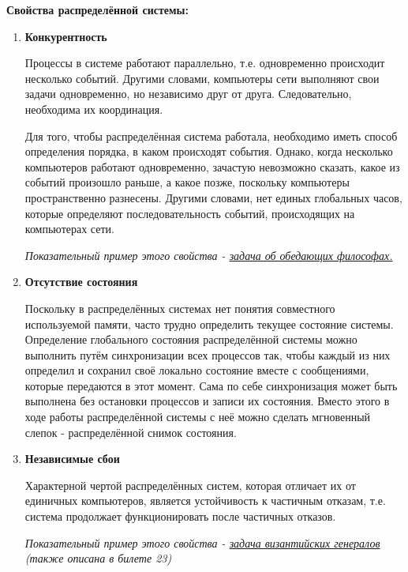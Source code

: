 \textbf{ Свойства распределённой системы:}
\begin{enumerate}
\item \textbf{Конкурентность}

Процессы в системе работают параллельно, т.е. одновременно происходит несколько событий. Другими словами, компьютеры сети выполняют свои задачи одновременно, но независимо друг от друга. Следовательно, необходима их координация.

Для того, чтобы распределённая система работала, необходимо иметь способ определения порядка, в каком происходят события. Однако, когда несколько компьютеров работают одновременно, зачастую невозможно сказать, какое из событий произошло раньше, а какое позже, поскольку компьютеры пространственно разнесены. Другими словами, нет единых глобальных часов, которые определяют последовательность событий, происходящих на компьютерах сети.

\textit{Показательный пример этого свойства - \textcolor{blue}{\href{https://clck.ru/puqyK}{задача об обедающих философах.}}}

\item \textbf{ Отсутствие состояния}

Поскольку в распределённых системах нет понятия совместного используемой памяти, часто трудно определить текущее состояние системы. Определение глобального состояния распределённой системы можно выполнить путём синхронизации всех процессов так, чтобы каждый из них определил и сохранил своё локально состояние вместе с сообщениями, которые передаются в этот момент. Сама по себе синхронизация может быть выполнена без остановки процессов и записи их состояния. Вместо этого в ходе работы распределённой системы с неё можно сделать мгновенный слепок - распределённой снимок состояния.

\item \textbf{ Независимые сбои}

Характерной чертой распределённых систем, которая отличает их от единичных компьютеров, является устойчивость к частичным отказам, т.е. система продолжает функционировать после частичных отказов.

\textit{Показательный пример этого свойства - \textcolor{blue}{\href{https://clck.ru/JVS7z}{задача византийских генералов}} (также описана в билете 23)}
\end{enumerate}

